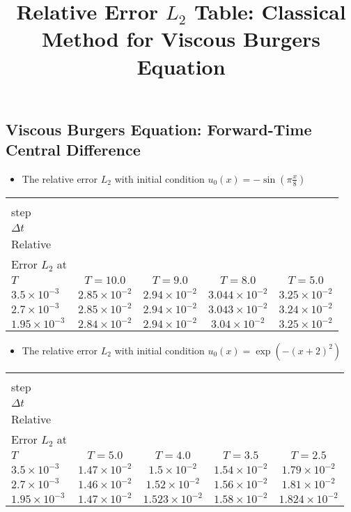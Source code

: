 \documentclass[12pt]{article}
\begin{document}
\title{Relative Error $L_{2}$ Table: Classical Method for Viscous Burgers Equation}
\author{}
\date{}

\maketitle



\subsection{Viscous Burgers Equation: Forward-Time Central Difference}

\begin{itemize}
    \item The relative error $L_{2}$ with initial condition $u_{0}(x) = -\sin(\pi \frac{x}{8})$
\end{itemize}

\centering
\begin{tabular}{|l|c|c|c|c|   }\hline
\diagbox[width=9em]{Time\\step\\$\Delta t$}{\\Relative\\Error $L_{2}$ at\\$T$ }&
  $T=10.0$ & $T=9.0$ & $T=8.0$ & $T=5.0$ \\ \hline
 $3.5 \times 10^{-3}$ & $2.85 \times 10^{-2}$ & $2.94 \times 10^{-2}$ & $3.044\times 10^{-2}$ & $3.25 \times 10^{-2}$ \\ \hline
 $2.7 \times 10^{-3} $ & $2.85 \times 10^{-2}$ & $2.94 \times 10^{-2}$ & $3.043 \times 10^{-2}$ & $3.24 \times 10^{-2}$ \\ \hline
 $1.95\times 10^{-3}$ & $2.84 \times 10^{-2}$ & $2.94 \times 10^{-2}$ & $3.04 \times 10^{-2}$ & $3.25 \times 10^{-2}$ \\ \hline
\end{tabular}



\begin{itemize}
    \item The relative error $L_{2}$ with initial condition $u_{0}(x) = \exp(-(x+2)^{2}) $
\end{itemize}

\centering
\begin{tabular}{|l|c|c|c|c|   }\hline
\diagbox[width=9em]{Time\\step\\$\Delta t$}{\\Relative\\Error $L_{2}$ at\\$T$ }&
  $T=5.0$ & $T=4.0$ & $T=3.5$ & $T=2.5$ \\ \hline
 $3.5 \times 10^{-3}$ & $1.47\times 10^{-2}$ & $1.5 \times 10^{-2}$ & $1.54 \times 10^{-2}$ & $1.79 \times 10^{-2}$ \\ \hline
 $2.7 \times 10^{-3} $ & $1.46 \times 10^{-2}$ & $1.52 \times 10^{-2}$ & $1.56 \times 10^{-2}$ & $1.81 \times 10^{-2}$ \\ \hline
 $1.95 \times 10^{-3}$ & $1.47 \times 10^{-2}$ & $1.523 \times 10^{-2}$ & $1.58\times 10^{-2}$ & $1.824 \times 10^{-2}$ \\ \hline
\end{tabular}
\end{document}
